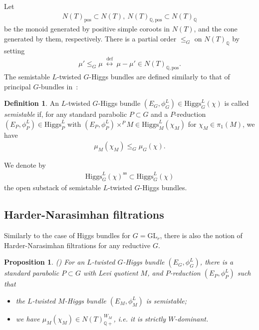 \documentclass [11pt,oneside,a4paper,mathscr]{amsart}
\newtheorem{prop}[thm]{Proposition}
\theoremstyle{definition}
\newtheorem{defn}[thm]{Definition}
\renewcommand{\leq}{\leqslant}
\newcommand{\Hig}{\mathrm{Higgs}}
\begin{document}
Let 
\begin{align}\label{pcones}
    N(T)_{\mathrm{pos}} \subset N(T), \ N(T)_{\mathbb{Q},\mathrm{pos}}\subset N(T)_{\mathbb{Q}}
\end{align}
be the monoid generated by positive simple coroots in $N(T)$, 
and the cone generated by them, respectively. 
There is a partial order $\leq_G$ on $N(T)_{\mathbb{Q}}$ by setting 
\begin{align*}\mu' \leq_G \mu \ \stackrel{\mathrm{def}}{\leftrightarrow} \ \mu-\mu'\in N(T)_{\mathbb{Q}, \mathrm{pos}}.
\end{align*}
The semistable $L$-twisted $G$-Higgs bundles are defined similarly to that of principal $G$-bundles 
in~\cite{SchHN}: 
\begin{defn}\label{def:Hsemi}
An $L$-twisted $G$-Higgs bundle $(E_G, \phi_G^{L}) \in \Hig_G^{L}(\chi)$ is called \textit{semistable} if, for any 
standard parabolic $P\subset G$ and a $P$-reduction 
$(E_P, \phi_P^L) \in \Hig_P^L$ with
$(E_P, \phi_P^L)\times^P M \in \Hig_M^L(\chi_M)$ for $\chi_M \in 
\pi_1(M)$, we have 
\begin{align*}
    \mu_M(\chi_M) \leq_G \mu_G(\chi). 
\end{align*}
    
\end{defn}

We denote by 
\begin{align*}
    \Hig_G^{L}(\chi)^{\mathrm{ss}} \subset \Hig_G^{L}(\chi)
\end{align*}
the open substack of semistable $L$-twisted $G$-Higgs bundles. 

\subsection{Harder-Narasimhan filtrations}\label{subsec:HNhiggs}
Similarly to the case of Higgs bundles for $G=\mathrm{GL}_r$, there is also the 
notion of Harder-Narasimhan filtrations for any reductive $G$. 
\begin{prop}\emph{(\cite{ArPa})}
For an $L$-twisted $G$-Higgs bundle $(E_G, \phi_G^{L})$, there is 
a standard parabolic $P\subset G$ with Levi quotient $M$, 
and $P$-reduction $(E_P, \phi_P^L)$
such that 
\begin{itemize}
    \item the $L$-twisted $M$-Higgs bundle  
    $(E_M, \phi_M^L)$ is semistable;
    \item we have $\mu_M(\chi_M) \in N(T)^{W_M}_{\mathbb{Q}+}$, i.e. it is strictly $W$-dominant.
\end{itemize}
\end{prop}
\end{document}
